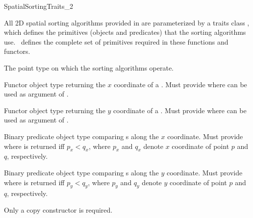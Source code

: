 

\begin{ccRefConcept}{SpatialSortingTraits_2}

\ccDefinition
  
All 2D spatial sorting algorithms provided in \cgal{} are parameterized
by a traits class , which defines the
primitives (objects and predicates) that the sorting algorithms use.
\ccRefName\ defines the complete set of primitives required in these
functions and functors.

\ccTypes
\ccAutoIndexingOff
{}

%
       {The point type on which the sorting algorithms operate.}


%
       {Functor object type returning the $x$ coordinate of a  .
       Must provide 
         where  can be used as
        argument of .
       }

%
       {Functor object type returning the $y$ coordinate of a  .
       Must provide 
         where  can be used as
        argument of .
       }

%
       {Binary predicate object type comparing s
        along the $x$ coordinate.
        Must provide 
         where 
        is returned iff $p_x < q_x$,
        where $p_x$ and $q_x$ denote $x$ coordinate of point $p$ and $q$,
        respectively.
       }

%
       {Binary predicate object type comparing s
        along the $y$ coordinate.
        Must provide 
         where 
        is returned iff $p_y < q_y$,
        where $p_y$ and $q_y$ denote $y$ coordinate of point $p$ and $q$,
        respectively.
       }


\ccCreation
{}  %

Only a copy constructor is required.



\end{ccRefConcept}

